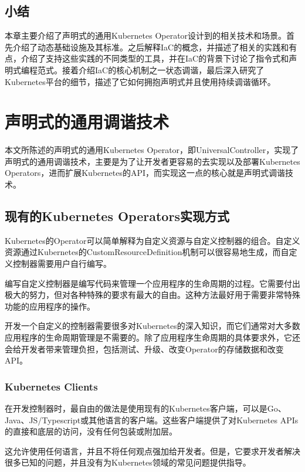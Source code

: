 \documentclass[macfonts,master]{njuthesis}
\begin{document}
\section{小结}
本章主要介绍了声明式的通用Kubernetes Operator设计到的相关技术和场景。首先介绍了动态基础设施及其标准。之后解释IaC的概念，并描述了相关的实践和有点，介绍了支持这些实践的不同类型的工具，并在IaC的背景下讨论了指令式和声明式编程范式。接着介绍IaC的核心机制之一状态调谐，最后深入研究了Kubernetes平台的细节，描述了它如何拥抱声明式并且使用持续调谐循环。

\chapter{声明式的通用调谐技术}\label{chapter_framework}
本文所陈述的声明式的通用Kubernetes Operator，即UniversalController，实现了声明式的通用调谐技术，主要是为了让开发者更容易的去实现以及部署Kubernetes Operators，进而扩展Kubernetes的API，而实现这一点的核心就是声明式调谐技术。

\section{现有的Kubernetes Operators实现方式}

Kubernetes的Operator可以简单解释为自定义资源与自定义控制器的组合。自定义资源通过Kubernetes的CustomResourceDefinition机制可以很容易地生成，而自定义控制器需要用户自行编写。

编写自定义控制器是编写代码来管理一个应用程序的生命周期的过程。它需要付出极大的努力，但对各种特殊的要求有最大的自由。这种方法最好用于需要非常特殊功能的应用程序的操作。

开发一个自定义的控制器需要很多对Kubernetes的深入知识，而它们通常对大多数应用程序的生命周期管理是不需要的。除了应用程序生命周期的具体要求外，它还会给开发者带来管理负担，包括测试、升级、改变Operator的存储数据和改变API\cite{kudovscc}。

\subsection{Kubernetes Clients}

在开发控制器时，最自由的做法是使用现有的Kubernetes客户端，可以是Go、Java、JS/Typescript或其他语言的客户端。这些客户端提供了对Kubernetes APIs的直接和底层的访问，没有任何包装或附加层。

这允许使用任何语言，并且不将任何观点强加给开发者。但是，它要求开发者解决很多已知的问题，并且没有为Kubernetes领域的常见问题提供指导\cite{kudovscc}。
\end{document}

